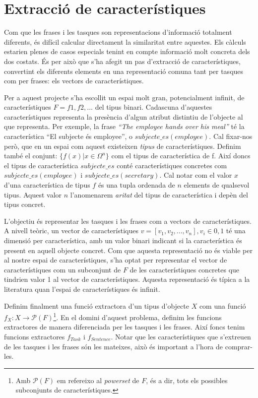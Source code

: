 \section{Extracció de característiques}
\label{sec:enfoc-extraccio}

Com que les frases i les tasques son representacions d'informació totalment diferents, és difícil calcular directament la similaritat entre aquestes. Els càlculs estarien plenes de casos especials tenint en compte informació molt concreta dels dos costats. És per això que s'ha afegit un pas d'extracció de característiques, convertint els diferents elements en una representació comuna tant per tasques com per frases: els vectors de característiques.

Per a aquest projecte s'ha escollit un espai molt gran, potencialment infinit, de característiques $F = {f1, f2, ...}$ del tipus binari. Cadascuna d'aquestes característiques representa la presència d'algun atribut distintiu de l'objecte al que representa. Per exemple, la frase \emph{``The employee hands over his meal''} té la característica ``El subjecte és employee'', o $subjecte\_es(employee)$. Cal fixar-nos però, que en un espai com aquest existeixen \emph{tipus} de característiques. Definim també el conjunt: $\{f(x) | x \in \Omega^n\}$ com el tipus de característica de f. Així doncs el tipus de característica $subjecte\_es$ conté característiques concretes com $subjecte\_es(employee)$ i $subjecte\_es(secretary)$. Cal notar com el valor $x$ d'una característica de tipus $f$ és una tupla ordenada de $n$ elements de qualsevol tipus. Aquest valor $n$ l'anomenarem \emph{aritat} del tipus de característica i depèn del tipus concret.

L'objectiu és representar les tasques i les frases com a vectors de característiques. A nivell teòric, un vector de característiques $v = [v_1, v_2, ..., v_n], v_i \in {0,1}$ té una dimensió per característica, amb un valor binari indicant si la característica és present en aquell objecte concret. Com que aquesta representació no és viable per al nostre espai de característiques, s'ha optat per representar el vector de característiques com un subconjunt de $F$ de les característiques concretes que tindrien valor 1 al vector de característiques. Aquesta representació és típica a la literatura quan l'espai de característiques és infinit. 

Definim finalment una funció extractora d'un tipus d'objecte $X$ com una funció $f_X: X \rightarrow \mathcal{P}(F)$\footnote{Amb $\mathcal{P}(F)$ em refereixo al \emph{powerset} de $F$, és a dir, tots els possibles subconjunts de característiques.}. En el domini d'aquest problema, definim les funcions extractores de manera diferenciada per les tasques i les frases. Així foncs tenim funcions extractores $f_{Task}$ i $f_{Sentence}$. Notar que les característiques que s'extreuen de les tasques i les frases són les mateixes, això és important a l'hora de comprar-les.

